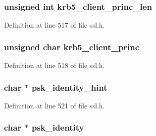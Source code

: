 \subsubsection[{\texorpdfstring{krb5\+\_\+client\+\_\+princ\+\_\+len}{krb5_client_princ_len}}]{\setlength{\rightskip}{0pt plus 5cm}unsigned int krb5\+\_\+client\+\_\+princ\+\_\+len}\hypertarget{structssl__session__st_aee332e95f309ecc64b24bc19dacf0720}{}\label{structssl__session__st_aee332e95f309ecc64b24bc19dacf0720}


Definition at line 517 of file ssl.\+h.

\subsubsection[{\texorpdfstring{krb5\+\_\+client\+\_\+princ}{krb5_client_princ}}]{\setlength{\rightskip}{0pt plus 5cm}unsigned char krb5\+\_\+client\+\_\+princ}\hypertarget{structssl__session__st_a63d257c18a0be317dc0462a8dec251c8}{}\label{structssl__session__st_a63d257c18a0be317dc0462a8dec251c8}


Definition at line 518 of file ssl.\+h.

\subsubsection[{\texorpdfstring{psk\+\_\+identity\+\_\+hint}{psk_identity_hint}}]{\setlength{\rightskip}{0pt plus 5cm}char $\ast$ psk\+\_\+identity\+\_\+hint}\hypertarget{structssl__session__st_ac93ab51ca7a64a11e87278ef4ab3fcd9}{}\label{structssl__session__st_ac93ab51ca7a64a11e87278ef4ab3fcd9}


Definition at line 521 of file ssl.\+h.

\subsubsection[{\texorpdfstring{psk\+\_\+identity}{psk_identity}}]{\setlength{\rightskip}{0pt plus 5cm}char $\ast$ psk\+\_\+identity}\hypertarget{structssl__session__st_a0888c0bb9a028250bd1fd8a602d22a01}{}\label{structssl__session__st_a0888c0bb9a028250bd1fd8a602d22a01}


